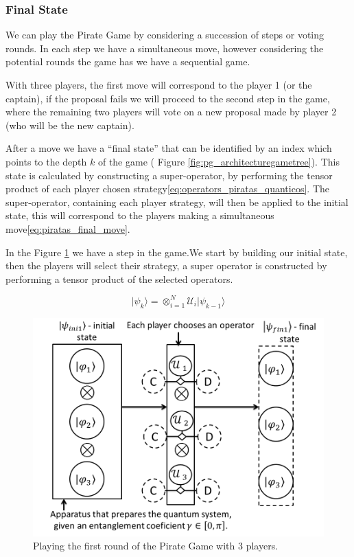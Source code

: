 \subsubsection{Final State}
\label{subsec:pirates_finalstate}

We can play the Pirate Game by considering a succession of steps or voting rounds. In each step we have a simultaneous move, however considering the potential rounds the game has we have a sequential game. 

With three players, the first move will correspond to the player 1 (or the captain), if the proposal fails we will proceed to the second step in the game, where the remaining two players will vote on a new proposal made by player 2 (who will be the new captain). 

After a move we have a ``final state'' that can be identified by an index which points to the depth $k$ of the game ( Figure \ref{fig:pg_architecturegametree}). This state is calculated by constructing a super-operator, by performing the tensor product of each player chosen strategy\ref{eq:operators_piratas_quanticos}. The super-operator, containing each player strategy, will then be applied to the initial state, this will correspond to the players making a simultaneous move\ref{eq:piratas_final_move}.

In the Figure \ref{fig:pg_architecture3players} we have a step in the game.We start by building our initial state, then the players will select their strategy, a super operator is constructed by performing a tensor product of the selected operators.

\begin{equation}
\vert\psi_{k}\rangle=\otimes_{i=1}^{N} \mathcal{U}_{i}\vert\psi_{k-1}\rangle\label{eq:piratas_final_move}
\end{equation}

\begin{figure}[h]
\centering 
\includegraphics[scale=0.35]{Figures/architecture/esquema/Slide1.png}
\caption{Playing the first round of the Pirate Game with 3 players. }
\label{fig:pg_architecture3players}
\end{figure}


